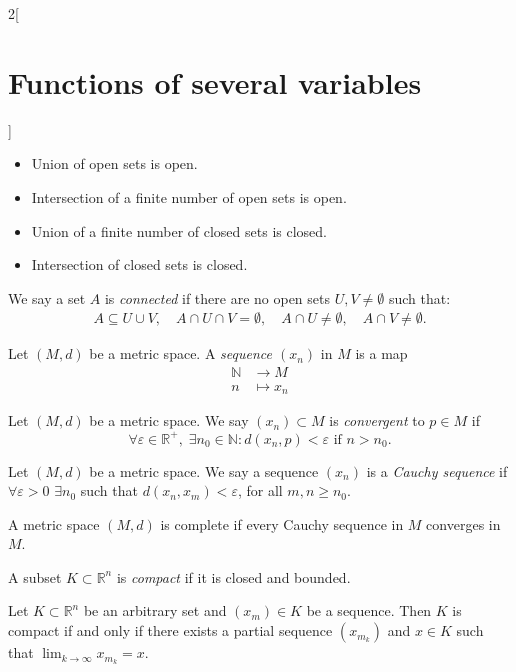 \documentclass[class=article,10pt,crop=false]{standalone}
\begin{document}
\begin{multicols}{2}[\section{Functions of several variables}]
\begin{prop}
\hfill
\begin{itemize}
    \item Union of open sets is open.
    \item Intersection of a finite number of open sets is open.
    \item Union of a finite number of closed sets is closed.
    \item Intersection of closed sets is closed.
\end{itemize}
\end{prop}
\begin{definition}
We say a set $A$ is \textit{connected} if there are no open sets $U,V\ne\emptyset$ such that: 
\begin{gather*}
    A\subseteq U\cup V,\quad A\cap U\cap V=\emptyset,\quad A\cap U\ne\emptyset,\quad A\cap V\ne\emptyset.
\end{gather*}
\end{definition}
\begin{definition}
Let $(M,d)$ be a metric space. A \textit{sequence $(x_n)$} in $M$ is a map
\begin{align*}
    \mathbb{N}&\longrightarrow M\\
    n&\longmapsto x_n
\end{align*}
\end{definition}
\begin{definition}
Let $(M,d)$ be a metric space. We say $(x_n)\subset M$ is \textit{convergent} to $p\in M$ if $$\forall\varepsilon\in\mathbb{R}^+,\;\exists n_0\in\mathbb{N}:d(x_n,p)<\varepsilon\text{ if }n>n_0.$$
\end{definition}
\begin{definition}
Let $(M,d)$ be a metric space. We say a sequence $(x_n)$ is a \textit{Cauchy sequence} if $\forall\varepsilon>0$ $\exists n_0$ such that $d(x_n,x_m)<\varepsilon$, for all $m,n\geq n_0$.
\end{definition}
\begin{definition}
A metric space $(M,d)$ is complete if every Cauchy sequence in $M$ converges in $M$.
\end{definition}
\begin{definition}
A subset $K\subset\mathbb{R}^n$ is \textit{compact} if it is closed and bounded.
\end{definition}
\begin{theorem}
Let $K\subset\mathbb{R}^n$ be an arbitrary set and $(x_m)\in K$ be a sequence. Then $K$ is compact if and only if there exists a partial sequence $(x_{m_k})$ and $x\in K$ such that $\displaystyle\lim_{k\to\infty}x_{m_k}=x$.
\end{theorem}

\end{multicols}
\end{document}
